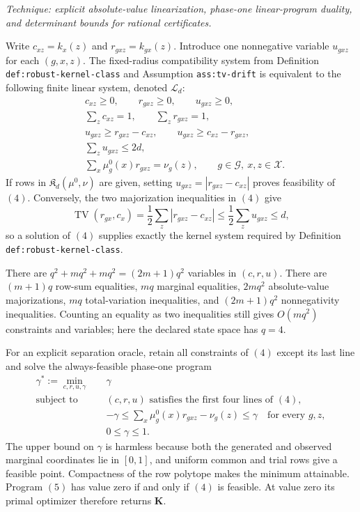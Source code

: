 \emph{Technique: explicit absolute-value linearization, phase-one linear-program duality, and determinant bounds for rational certificates.}

Write \(c_{xz}=k_x(z)\) and \(r_{gxz}=k_{gx}(z)\).  Introduce one nonnegative variable \(u_{gxz}\) for each \((g,x,z)\).  The fixed-radius compatibility system from Definition \texttt{def:robust-kernel-class} and Assumption \texttt{ass:tv-drift} is equivalent to the following finite linear system, denoted \(\mathcal L_d\):
\[
\begin{aligned}
 &c_{xz}\ge0,\qquad r_{gxz}\ge0,\qquad u_{gxz}\ge0,\\
 &\sum_z c_{xz}=1,\qquad \sum_z r_{gxz}=1,\\
 &u_{gxz}\ge r_{gxz}-c_{xz},\qquad
   u_{gxz}\ge c_{xz}-r_{gxz},\\
 &\sum_z u_{gxz}\le2d,\\
 &\sum_x\mu_g^0(x)r_{gxz}=\nu_g(z),
 \qquad g\in\mathcal G,\ x,z\in\mathcal X.
\end{aligned}
\tag{4}
\]
If rows in \(\mathfrak K_d(\mu^0,\nu)\) are given, setting
\(u_{gxz}=|r_{gxz}-c_{xz}|\) proves feasibility of \((4)\).  Conversely, the two majorization inequalities in \((4)\) give
\[
 \operatorname{TV}(r_{gx},c_x)
 =\frac12\sum_z|r_{gxz}-c_{xz}|
 \le\frac12\sum_z u_{gxz}\le d,
\]
so a solution of \((4)\) supplies exactly the kernel system required by Definition \texttt{def:robust-kernel-class}.

There are \(q^2+mq^2+mq^2=(2m+1)q^2\) variables in \((c,r,u)\).  There are \((m+1)q\) row-sum equalities, \(mq\) marginal equalities, \(2mq^2\) absolute-value majorizations, \(mq\) total-variation inequalities, and \((2m+1)q^2\) nonnegativity inequalities.  Counting an equality as two inequalities still gives \(O(mq^2)\) constraints and variables; here the declared state space has \(q=4\).

For an explicit separation oracle, retain all constraints of \((4)\) except its last line and solve the always-feasible phase-one program
\[
\begin{aligned}
 \gamma^*:=\min_{c,r,u,\gamma}\quad &\gamma\\
 \text{subject to}\quad
 & (c,r,u)\text{ satisfies the first four lines of }(4),\\
 &-\gamma\le \sum_x\mu_g^0(x)r_{gxz}-\nu_g(z)\le\gamma
       \quad\text{for every }g,z,\\
 &0\le\gamma\le1.
\end{aligned}
\tag{5}
\]
The upper bound on \(\gamma\) is harmless because both the generated and observed marginal coordinates lie in \([0,1]\), and uniform common and trial rows give a feasible point.  Compactness of the row polytope makes the minimum attainable.  Program \((5)\) has value zero if and only if \((4)\) is feasible.  At value zero its primal optimizer therefore returns \(\mathbf K\).

